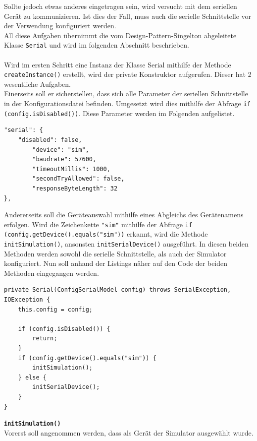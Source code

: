 Sollte jedoch etwas anderes eingetragen sein, wird versucht mit dem seriellen Gerät zu kommunizieren.
Ist dies der Fall, muss auch die serielle Schnittstelle vor der Verwendung konfiguriert werden.\\
All diese Aufgaben übernimmt die vom Design-Pattern-Singelton abgeleitete Klasse \lstinline[style=java]{Serial} und wird im folgenden Abschnitt beschrieben.\\\\
Wird im ersten Schritt eine Instanz der Klasse Serial mithilfe der Methode \lstinline[style=java]{createInstance()} erstellt, wird der private Konstruktor aufgerufen.
Dieser hat 2 wesentliche Aufgaben.\\
Einerseits soll er sicherstellen, dass sich alle Parameter der seriellen Schnittstelle in der Konfigurationsdatei befinden.
Umgesetzt wird dies mithilfe der Abfrage \lstinline[style=java]{if (config.isDisabled())}.
Diese Parameter werden im Folgenden aufgelistet.
\begin{lstlisting}[style=json,caption=Teilabschnitt Konfigurationsdatei,label=jsonSerial]
"serial": {
    "disabled": false,
        "device": "sim",
        "baudrate": 57600,
        "timeoutMillis": 1000,
        "secondTryAllowed": false,
        "responseByteLength": 32
},
\end{lstlisting}
Andererseits soll die Geräteauswahl mithilfe eines Abgleichs des Gerätenamens erfolgen.
Wird die Zeichenkette \lstinline[style=json]{"sim"} mithilfe der Abfrage \lstinline[style=java]{if (config.getDevice().equals("sim"))} erkannt, wird die Methode \lstinline[style=java]{initSimulation()}, ansonsten \lstinline[style=java]{initSerialDevice()} ausgeführt.
In diesen beiden Methoden werden sowohl die serielle Schnittstelle, als auch der Simulator konfiguriert.
Nun soll anhand der Listings näher auf den Code der beiden Methoden eingegangen werden.
\begin{lstlisting}[style=java,caption=Teilabschnitt Konstruktor Serial(),label=serialInit]
private Serial(ConfigSerialModel config) throws SerialException, IOException {
    this.config = config;

    if (config.isDisabled()) {
        return;
    }
    if (config.getDevice().equals("sim")) {
        initSimulation();
    } else {
        initSerialDevice();
    }
}
\end{lstlisting}
\textbf{\lstinline{initSimulation()}}
\\
Vorerst soll angenommen werden, dass als Gerät der Simulator ausgewählt wurde.
